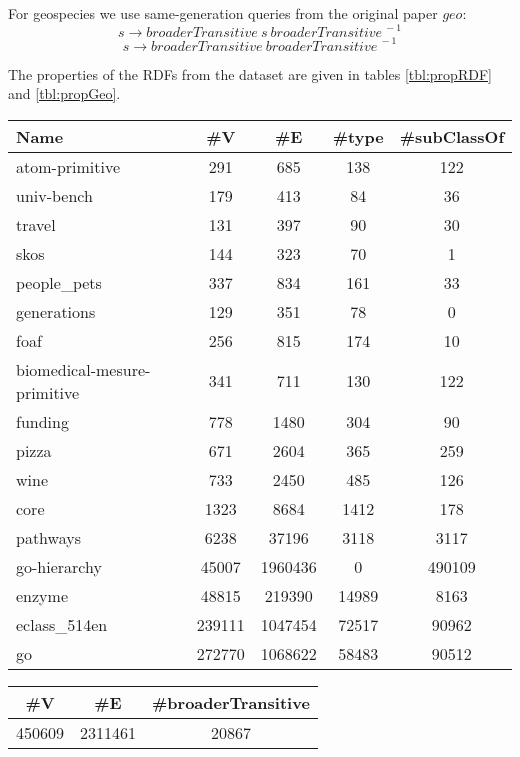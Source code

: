 For geospecies we use same-generation queries from the original paper $geo$: \[s \rightarrow \textit{broaderTransitive} \ s \ \textit{broaderTransitive}^{\ -1} \]
\[s \rightarrow \textit{broaderTransitive}  \ \textit{broaderTransitive}^{\ -1} \]


The properties of the RDFs from the dataset are given in tables \ref{tbl:propRDF} and \ref{tbl:propGeo}.

{\setlength{\tabcolsep}{0.4em}
	\begin{table*}[h]
		\caption{RDFs properties}
		\label{tbl:propRDF}
		\begin{tabular}{| l | c | c | c | c |}
			\hline
			Name                  & \#V    & \#E     & \#type &\#subClassOf \\
			\hline
			\hline
			atom-primitive				& 291		& 685		& 138	& 122	\\
			univ-bench					& 179		& 413		& 84		& 36		\\
			travel						& 131		& 397		& 90		& 30		\\
			skos							& 144		& 323		& 70		& 1		\\
			people\_pets					& 337		& 834		& 161	& 33		\\
			generations					& 129		& 351		& 78		& 0		\\
			foaf							& 256		& 815		& 174	& 10		\\
			biomedical-mesure-primitive	& 341		& 711		& 130	& 122	\\
			funding						& 778		& 1480		& 304	& 90               \\
			pizza						& 671		& 2604		& 365	& 259              \\
			wine							& 733		& 2450		& 485	& 126              \\
			core							& 1323		& 8684		& 1412	& 178              \\
			pathways						& 6238		& 37196		& 3118 	& 3117             \\
			go-hierarchy					& 45007		& 1960436	& 0		& 490109           \\
			enzyme						& 48815		& 219390		& 14989	& 8163             \\
			eclass\_514en				& 239111		& 1047454	& 72517	& 90962            \\
			go							& 272770		& 1068622	& 58483	& 90512            \\
			\hline
		\end{tabular}
	\end{table*}
}


{\setlength{\tabcolsep}{0.4em}
	\begin{table*}[h]
		\caption{Geospecies properties}
		\label{tbl:propGeo}
		\begin{tabular}{| c | c | c |}
			\hline
			\#V    & \#E     & \#broaderTransitive \\
			\hline
			\hline
			450609 & 2311461 & 20867 \\
			\hline
		\end{tabular}
	\end{table*}
}
